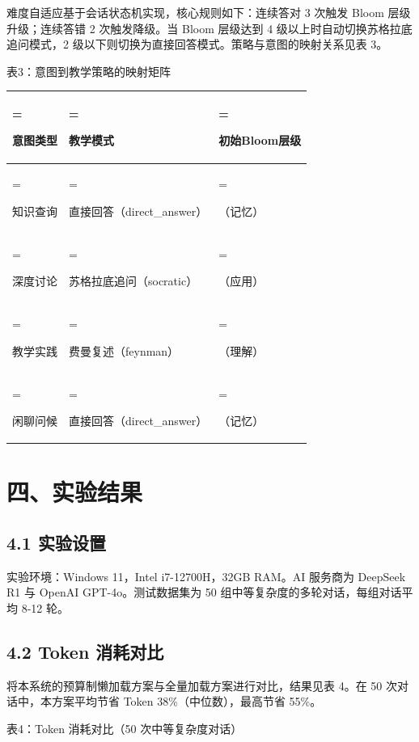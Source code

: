 \documentclass{harryopo-mathnotes}
\begin{document}
难度自适应基于会话状态机实现，核心规则如下：连续答对 3 次触发 Bloom
层级升级；连续答错 2 次触发降级。当 Bloom 层级达到 4
级以上时自动切换苏格拉底追问模式，2
级以下则切换为直接回答模式。策略与意图的映射关系见表 3。

表3：意图到教学策略的映射矩阵

\begin{table}[htbp]
\centering
\begin{tabularx}{\textwidth}{>{\hsize=0.522\hsize\linewidth=\hsize\raggedright\arraybackslash}X>{\hsize=1.630\hsize\linewidth=\hsize\raggedright\arraybackslash}X>{\hsize=0.848\hsize\linewidth=\hsize\raggedright\arraybackslash}X}
\toprule
\textbf{\textbf{意图类型}} & \textbf{\textbf{教学模式}} & \textbf{\textbf{初始Bloom层级}} \\
\midrule
知识查询 & 直接回答（direct\_answer） & 1（记忆） \\
深度讨论 & 苏格拉底追问（socratic） & 3（应用） \\
教学实践 & 费曼复述（feynman） & 2（理解） \\
闲聊问候 & 直接回答（direct\_answer） & 1（记忆） \\
\bottomrule
\end{tabularx}
\end{table}

\section{四、实验结果}\label{ux56dbux5b9eux9a8cux7ed3ux679c}

\subsection{4.1 实验设置}\label{ux5b9eux9a8cux8bbeux7f6e}

实验环境：Windows 11，Intel i7-12700H，32GB RAM。AI 服务商为 DeepSeek R1
与 OpenAI GPT-4o。测试数据集为 50 组中等复杂度的多轮对话，每组对话平均
8-12 轮。

\subsection{4.2 Token 消耗对比}\label{token-ux6d88ux8017ux5bf9ux6bd4}

将本系统的预算制懒加载方案与全量加载方案进行对比，结果见表 4。在 50
次对话中，本方案平均节省 Token 38\%（中位数），最高节省 55\%。

表4：Token 消耗对比（50 次中等复杂度对话）
\end{document}
